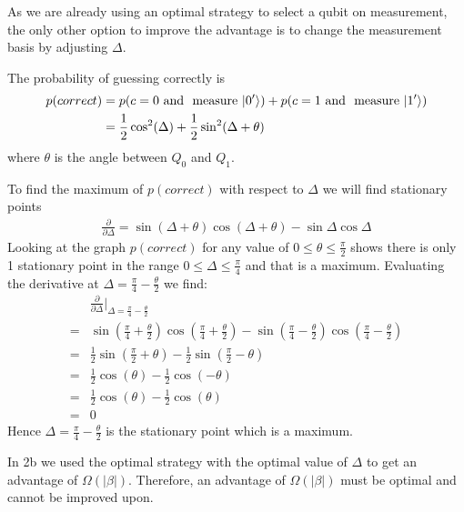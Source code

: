 As we are already using an optimal strategy to select a qubit on measurement, the only other option to improve the advantage is to change the measurement basis by adjusting $\Delta$.

The probability of guessing correctly is 
\begin{align*}
    p(correct) &= p(c=0 \text{ and } \text{ measure } \lvert0'\rangle) + p(c=1 \text{ and } \text{ measure } \lvert1'\rangle)\\
    &=\frac{1}{2} \cos^2 (\Delta) + \frac{1}{2}\sin^2(\Delta + \theta) 
\end{align*}
where $\theta$ is the angle between $Q_0$ and $Q_1$.

To find the maximum of $p(correct)$ with respect to $\Delta$ we will find stationary points
\begin{align*}
    \frac{\partial }{\partial \Delta} = \sin (\Delta + \theta) \cos (\Delta + \theta) - \sin \Delta \cos \Delta
\end{align*}
Looking at the graph $p(correct)$ for any value of $0\leq\theta\leq\frac{\pi}{2}$ shows there is only 1 stationary point in the range $0\leq \Delta \leq \frac{\pi}{4}$ and that is a maximum.
Evaluating the derivative at $\Delta = \frac{\pi}{4} - \frac{\theta}{2}$ we find:
\begin{align*}
    &\frac{\partial }{\partial \Delta}\Bigr\rvert_{\Delta = \frac{\pi}{4} - \frac{\theta}{2}}\\
    =& \sin (\frac{\pi}{4} + \frac{\theta}{2} ) \cos (\frac{\pi}{4} + \frac{\theta}{2} ) - \sin(\frac{\pi}{4} - \frac{\theta}{2}) \cos(\frac{\pi}{4} - \frac{\theta}{2})\\
    =& \frac{1}{2}\sin (\frac{\pi}{2} + \theta ) - \frac{1}{2}\sin(\frac{\pi}{2} - \theta)\\
    =& \frac{1}{2}\cos (\theta ) - \frac{1}{2}\cos(- \theta)\\
    =& \frac{1}{2}\cos (\theta ) - \frac{1}{2}\cos( \theta)\\
    =& 0
\end{align*}
Hence $\Delta = \frac{\pi}{4} - \frac{\theta}{2}$ is the stationary point which is a maximum.

In 2b we used the optimal strategy with the optimal value of $\Delta$ to get an advantage of $\Omega(|\beta|)$.
Therefore, an advantage of $\Omega(|\beta|)$ must be optimal and cannot be improved upon.

